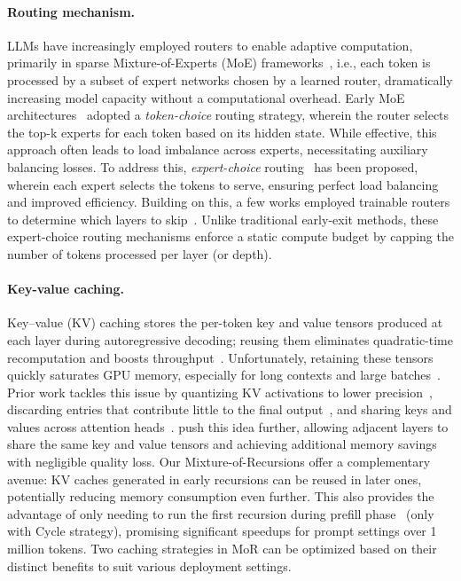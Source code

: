 \paragraph{Routing mechanism.} 
LLMs have increasingly employed routers to enable adaptive computation, primarily in sparse Mixture-of-Experts (MoE) frameworks~\citep{shazeer2017outrageously, lepikhin2020gshard, dai2022stablemoe, zoph2022st}, i.e., each token is processed by a subset of expert networks chosen by a learned router, dramatically increasing model capacity without a computational overhead. Early MoE architectures~\citep{lepikhin2020gshard, fedus2022switch, jiang2024mixtral} adopted a \textit{token-choice} routing strategy, wherein the router selects the top-k experts for each token based on its hidden state. While effective, this approach often leads to load imbalance across experts, necessitating auxiliary balancing losses. 
To address this, \textit{expert-choice} routing~\citep{zhou2022mixture, guo2025deepseek} has been proposed, wherein each expert selects the tokens to serve, ensuring perfect load balancing and improved efficiency. 
Building on this, a few works employed trainable routers to determine which layers to skip~\citep{zeng2023learning, raposo2024mixture, gadhikar2024attention}. Unlike traditional early-exit methods, these expert-choice routing mechanisms enforce a static compute budget by capping the number of tokens processed per layer (or depth). 


\vspace{-10pt}
\paragraph{Key-value caching.}
Key–value (KV) caching stores the per-token key and value tensors produced at each layer during autoregressive decoding; reusing them eliminates quadratic-time recomputation and boosts throughput~\citep{shazeer2019fast, ge2023model, liu2024minicache, xiao2023efficient, pope2022efficiently, kang2024gear0, brandon2024reducing}.
%
Unfortunately, retaining these tensors quickly saturates GPU memory, especially for long contexts and large batches~\citep{chowdhery2023palm, brandon2024reducing}.
%
Prior work tackles this issue by quantizing KV activations to lower precision~\citep{hooper2024kvquant0, zhang2024kv}, discarding entries that contribute little to the final output~\citep{zhang2023h2o, liu2023scissorhands}, and sharing keys and values across attention heads~\citep{shazeer2019fast, ainslie2023gqa}.
%
\citet{brandon2024reducing} push this idea further, allowing adjacent layers to share the same key and value tensors and achieving additional memory savings with negligible quality loss.
%
Our Mixture-of-Recursions offer a complementary avenue: KV caches generated in early recursions can be reused in later ones, potentially reducing memory consumption even further.
This also provides the advantage of only needing to run the first recursion during prefill phase~\citep{sun2024you} (only with Cycle strategy), promising significant speedups for prompt settings over 1 million tokens. Two caching strategies in MoR can be optimized based on their distinct benefits to suit various deployment settings.



